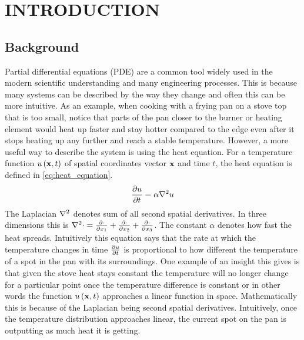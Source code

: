 \chapter{INTRODUCTION}
\section{Background}
\label{sec:background} %
\noindent Partial differential equations (PDE) are a common tool widely used in the modern scientific understanding and many engineering processes. This is because many systems can be described by the way they change and often this can be more intuitive. As an example, when cooking with a frying pan on a stove top that is too small, notice that parts of the pan closer to the burner or heating element would heat up faster and stay hotter compared to the edge even after it stops heating up any further and reach a stable temperature. However, a more useful way to describe the system is using the heat equation. For a temperature function $u\left(\vb{x},t\right)$ of spatial coordinates vector $\vb{x}$ and time $t$, the heat equation is defined in \cref{eq:heat_equation}.
\begin{equation} \label{eq:heat_equation}
    \pdv{u}{t}=\alpha\laplacian u
\end{equation}
The Laplacian $\laplacian$ denotes sum of all second spatial derivatives. In three dimensions this is $\laplacian\cdot=\pdv{\cdot}{x_1}+\pdv{\cdot}{x_2}+\pdv{\cdot}{x_3}$. The constant $\alpha$ denotes how fast the heat spreads. Intuitively this equation says that the rate at which the temperature changes in time $\pdv{u}{t}$ is proportional to how different the temperature of a spot in the pan with its surroundings. One example of an insight this gives is that given the stove heat stays constant the temperature will no longer change for a particular point once the temperature difference is constant or in other words the function $u\left(\vb{x},t\right)$ approaches a linear function in space. Mathematically this is because of the Laplacian being second spatial derivatives. Intuitively, once the temperature distribution approaches linear, the current spot on the pan is outputting as much heat it is getting.

